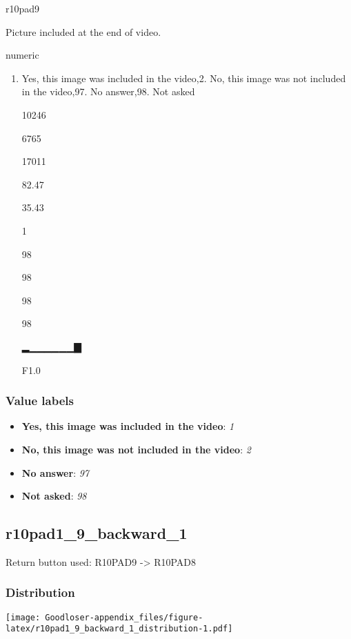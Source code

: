 \documentclass[]{book}
\providecommand{\tightlist}{%
  \setlength{\itemsep}{0pt}\setlength{\parskip}{0pt}}
\begin{document}
r10pad9

Picture included at the end of video.

numeric

\begin{enumerate}
\def\labelenumi{\arabic{enumi}.}
\tightlist
\item
  Yes, this image was included in the video,2. No, this image was not
  included in the video,97. No answer,98. Not asked

  10246

  6765

  17011

  82.47

  35.43

  1

  98

  98

  98

  98

  ▂▁▁▁▁▁▁▇

  F1.0
\end{enumerate}

\subsubsection{Value labels}\label{r10pad9_labels}

\begin{itemize}
\tightlist
\item
  \textbf{Yes, this image was included in the video}: \emph{1}
\item
  \textbf{No, this image was not included in the video}: \emph{2}
\item
  \textbf{No answer}: \emph{97}
\item
  \textbf{Not asked}: \emph{98}
\end{itemize}

\subsection{r10pad1\_9\_backward\_1}\label{r10pad1_9_backward_1}

Return button used: R10PAD9 -\textgreater{} R10PAD8

\subsubsection{Distribution}\label{r10pad1_9_backward_1_distribution}

\texttt{[image: Goodloser-appendix\_files/figure-latex/r10pad1\_9\_backward\_1\_distribution-1.pdf]}
\end{document}
